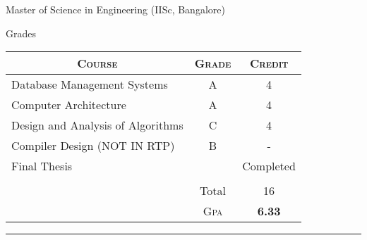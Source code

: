\documentclass[a4paper,10pt]{article} %
\begin{document}
\newpage


\par{\centering\Large \hypertarget{iisc}{Master of Science in  Engineering (IISc, Bangalore)}\par}\large{\centering Grades\par}\normalsize

\begin{center}
\begin{tabular}{lcc}
\multicolumn{1}{c}{\textsc{Course}} & \textsc{Grade}&\textsc{Credit}\\ \hline
Database Management Systems & A & 4\\
Computer Architecture & A & 4\\
Design and Analysis of Algorithms & C & 4\\
Compiler Design (NOT IN RTP) & B & -\\
Final Thesis &  & Completed \\
&&\\
& Total & 16\\\cline{2-3}
&\textsc{Gpa}&\textbf{6.33}
\end{tabular}
\end{center}
\bigskip
\hrule
\bigskip


\bigskip
\end{document}

